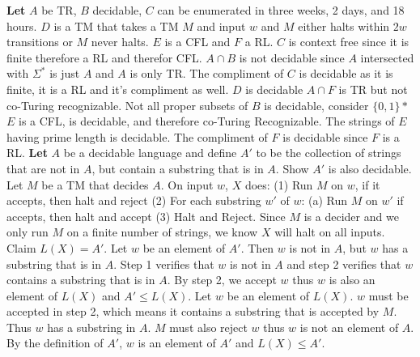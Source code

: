 \documentclass[9pt]{article}
\begin{document}
\begin{multicols*}{2}
    \textbf{Let} $A$ be TR, $B$ decidable, $C$ can be enumerated in three weeks, 2 days, and 18 hours. $D$ is a TM that takes a TM $M$ and input $w$ and $M$ either halts within $2w$ transitions or $M$ never halts. $E$ is a CFL and $F$ a RL.\newline
    $C$ is context free since it is finite therefore a RL and therefor CFL.\newline
    $A\cap B$ is not decidable since $A$ intersected with $\Sigma^*$ is just $A$ and $A$ is only TR.\newline
    The compliment of $C$ is decidable as it is finite, it is a RL and it's compliment as well.\newline
    $D$ is decidable\newline
    $A\cap F$ is TR but not co-Turing recognizable.\newline
    Not all proper subsets of $B$ is decidable, consider $\{0,1\}*$\newline
    $E$ is a CFL, is decidable, and therefore co-Turing Recognizable.\newline
    The strings of $E$ having prime length is decidable.\newline
    The compliment of $F$ is decidable since $F$ is a RL.\newline
    \textbf{Let} $A$ be a decidable language and define $A'$ to be the collection of strings that are not in $A$, but contain a substring that is in $A$. Show $A'$ is also decidable.\newline
    Let $M$ be a TM that decides $A$. On input $w$, $X$ does:\newline
    (1) Run $M$ on $w$, if it accepts, then halt and reject\newline
    (2) For each substring $w'$ of $w$:\newline
    \indent(a) Run $M$ on $w'$ if accepts, then halt and accept\newline
    (3) Halt and Reject.\newline
    Since $M$ is a decider and we only run $M$ on a finite number of strings, we know $X$ will halt on all inputs. Claim $L(X) = A'$.\newline
    Let $w$ be an element of $A'$. Then $w$ is not in $A$, but $w$ has a substring that is in $A$. Step 1 verifies that $w$ is not in $A$ and step 2 verifies that $w$ contains a substring that is in $A$. By step 2, we accept $w$ thus $w$ is also an element of $L(X)$ and $A'\leq L(X)$.\newline
    Let $w$ be an element of $L(X)$. $w$ must be accepted in step 2, which means it contains a substring that is accepted by $M$. Thus $w$ has a substring in $A$. $M$ must also reject $w$ thus $w$ is not an element of $A$. By the definition of $A'$, $w$ is an element of $A'$ and $L(X)\leq A'$.\newline

\end{multicols*}
\end{document}
